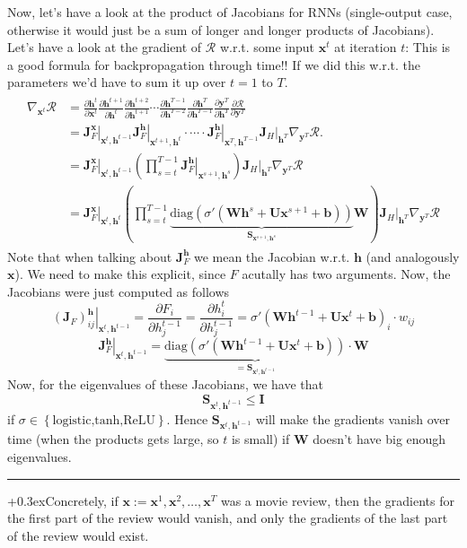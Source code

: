 \documentclass[a2paper,8pt]{extarticle}
\newcommand{\tcr}[1]{\textcolor{lighttext}{#1}}
\newcommand{\tcr}[1]{\textcolor{red}{#1}}
\newcommand{\cR}{\mathcal{R}}
\newcommand{\set}[1]{\left\{ #1 \right\}}
\newcommand{\diag}{\text{diag}}
\newcommand{\mat}[1]{\mathbf{#1}}
\renewcommand{\vec}[1]{\mathbf{#1}}
\newcommand{\vb}{\vec{b}}
\newcommand{\vh}{\vec{h}}
\newcommand{\vx}{\vec{x}}
\newcommand{\vy}{\vec{y}}
\newcommand{\MI}{\mat{I}}
\newcommand{\MJ}{\mat{J}}
\newcommand{\MS}{\mat{S}}
\newcommand{\MU}{\mat{U}}
\newcommand{\MW}{\mat{W}}
\newcommand{\evalat}[2]{\left. #1 \right|_{#2}}
\newcommand{\customboxpaddingsize}{0pt}
\newcommand{\emptyarg}[1][]{\ifthenelse{\isempty{#1}}{}{\ (#1)}}
\newcommand{\Ex}[1][]{{\setlength\fboxsep{\customboxpaddingsize}
\colorbox{excolor}{%
\color{custtitlecolor}{\textbf{Ex.\emptyarg[#1]}}}\kern+0.3ex}}
\newcommand{\sep}{\vspace{0pt}\noindent\hrule\vspace{0pt}}
\newcommand{\sep}{\vspace{5pt}\noindent\hrule\vspace{5pt}}
\begin{document}
\begin{landscape}
\begin{multicols*}{7}
Now, let's have a look at the product of Jacobians for RNNs (single-output
case, otherwise it would just be a sum of longer and longer products of
Jacobians). Let's have a look at the gradient of $\cR$ w.r.t. some input
$\vx^t$ at iteration $t$:
\tcr{This is a good formula for backpropagation through time!! If we did this
w.r.t. the parameters we'd have to sum it up over $t=1$ to $T$.}
\begin{gather*}
\begin{align*}
\nabla_{\vx^t}\cR
&=
\frac{\partial \vh^t}{\partial \vx^t}
\frac{\partial \vh^{t+1}}{\partial \vh^t}
\frac{\partial \vh^{t+2}}{\partial \vh^{t+1}}
\cdots
\frac{\partial \vh^{T-1}}{\partial \vh^{T-2}}
\frac{\partial \vh^T}{\partial \vh^{T-1}}
\frac{\partial \vy^T}{\partial \vh^T}
\frac{\partial \cR}{\partial \vy^T}
\\
&=
\evalat{\MJ_{F}^\vx}{\vx^t,\vh^{t-1}}
\evalat{\MJ_{F}^\vh}{\vx^{t+1},\vh^t}
\cdot\cdots\cdot
\evalat{\MJ_{F}^\vh}{\vx^T,\vh^{T-1}}
\evalat{\MJ_{H}}{\vh^{T}}
\nabla_{\vy^T}\cR.
\\
&=
\evalat{\MJ_{F}^\vx}{\vx^t,\vh^{t-1}}
\left(
\prod_{s=t}^{T-1}
\evalat{\MJ_{F}^\vh}{\vx^{s+1},\vh^{s}}
\right)
\evalat{\MJ_{H}}{\vh^{T}}
\nabla_{\vy^T}\cR
\\
&=
\evalat{\MJ_{F}^\vx}{\vx^t,\vh^{t}}
\left(
\prod_{s=t}^{T-1}
\underbrace{\diag(\sigma'(\MW\vh^{s}+\MU\vx^{s+1}+\vb))}_{
\MS_{\vx^{s+1},\vh^{s}}
}
\MW
\right)
\evalat{\MJ_{H}}{\vh^{T}}
\nabla_{\vy^T}\cR
\end{align*}
\end{gather*}
Note that when talking about $\MJ_F^\vh$ we mean the Jacobian w.r.t. $\vh$ (and
analogously $\vx$). We need to make this explicit, since $F$ acutally has
two arguments. Now, the Jacobians were just computed as follows
\[
\evalat{(\MJ_F)_{ij}^{\vh}}{\vx^t,\vh^{t-1}}
=
\frac{\partial F_i}{\partial h_j^{t-1}}
=
\frac{\partial h^t_i}{\partial h_j^{t-1}}
=
\sigma'(\MW\vh^{t-1}+\MU\vx^t+\vb)_i\cdot w_{ij}
\]
\[
\evalat{\MJ_F^\vh}{\vx^t,\vh^{t-1}}
=
\underbrace{
\diag(\sigma'(\MW\vh^{t-1}+\MU\vx^t+\vb))}_{
=\MS_{\vx^t,\vh^{t-1}}
}
\cdot
\MW
\]
Now, for the eigenvalues of these Jacobians, we have that
\[
\MS_{\vx^t,\vh^{t-1}}\leq\MI
\tag{\circ}
\]
if $\sigma\in\set{\text{logistic,tanh,ReLU}}$. Hence $\MS_{\vx^t,\vh^{t-1}}$
will make the gradients vanish over time (when the products gets large, so $t$
is small) if $\MW$ doesn't have big enough eigenvalues.

\sep

\Ex Concretely, if $\vx:=\vx^1,\vx^2,\ldots,\vx^T$ was a movie review, then the
gradients for the first part of the review would vanish, and only the
gradients of the last part of the review would exist.


\end{multicols*}
\end{landscape}
\end{document}
